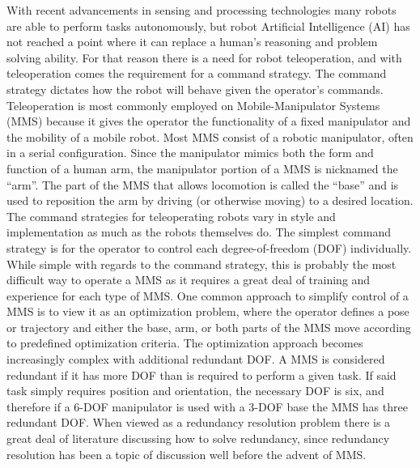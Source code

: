 \documentclass[onecolumn,10pt,final]{asme2ej}
\begin{document}
With recent advancements in sensing and processing technologies many robots are able to perform tasks autonomously, but robot Artificial Intelligence (AI) has not reached a point where it can replace a human's reasoning and problem solving ability. For that reason there is a need for robot teleoperation, and with teleoperation comes the requirement for a command strategy. The command strategy dictates how the robot will behave given the operator's commands. Teleoperation is most commonly employed on Mobile-Manipulator Systems (MMS) because it gives the operator the functionality of a fixed manipulator and the mobility of a mobile robot. Most MMS consist of a robotic manipulator, often in a serial configuration. Since the manipulator mimics both the form and function of a human arm, the manipulator portion of a MMS is nicknamed the ``arm''. The part of the MMS that allows locomotion is called the ``base'' and is used to reposition the arm by driving (or otherwise moving) to a desired location.\\

The command strategies for teleoperating robots vary in style and implementation as much as the robots themselves do. The simplest command strategy is for the operator to control each degree-of-freedom (DOF) individually. While simple with regards to the command strategy, this is probably the most difficult way to operate a MMS as it requires a great deal of training and experience for each type of MMS. One common approach to simplify control of a MMS is to view it as an optimization problem, where the operator defines a pose or trajectory and either the base, arm, or both parts of the MMS move according to predefined optimization criteria\cite{yasuaki}. The optimization approach becomes increasingly complex with additional redundant DOF. A MMS is considered redundant if it has more DOF than is required to perform a given task. If said task simply requires position and orientation, the necessary DOF is six, and therefore if a 6-DOF manipulator is used with a 3-DOF base the MMS has three redundant DOF. When viewed as a redundancy resolution problem there is a great deal of literature discussing how to solve redundancy, since redundancy resolution has been a topic of discussion well before the advent of MMS.\\
\end{document}
